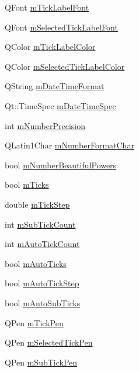 \begin{DoxyCompactItemize}
\item 
Q\+Font \hyperlink{class_q_c_p_axis_add79d1e39c4ed65869a1e9cc79043f3f}{m\+Tick\+Label\+Font}
\item 
Q\+Font \hyperlink{class_q_c_p_axis_a4f2e4919da9615dac612662c249b1119}{m\+Selected\+Tick\+Label\+Font}
\item 
Q\+Color \hyperlink{class_q_c_p_axis_a6384a749b3b56a97df081d8082321ab4}{m\+Tick\+Label\+Color}
\item 
Q\+Color \hyperlink{class_q_c_p_axis_a3bcad40902f45dc4c991a2c3e4d31d70}{m\+Selected\+Tick\+Label\+Color}
\item 
Q\+String \hyperlink{class_q_c_p_axis_a0b7ad83550d71daab4cfee2918e168e0}{m\+Date\+Time\+Format}
\item 
Qt\+::\+Time\+Spec \hyperlink{class_q_c_p_axis_af73bec228c1a3203dc8aef1e84a46759}{m\+Date\+Time\+Spec}
\item 
int \hyperlink{class_q_c_p_axis_acd76e8c783384d99ccc4a13797eec188}{m\+Number\+Precision}
\item 
Q\+Latin1\+Char \hyperlink{class_q_c_p_axis_a39594313deef458f425bba25cd337a8a}{m\+Number\+Format\+Char}
\item 
bool \hyperlink{class_q_c_p_axis_af03809bee3f3e35fcc38d25b6dd5003b}{m\+Number\+Beautiful\+Powers}
\item 
bool \hyperlink{class_q_c_p_axis_ab111e74bba22e06848897c932fc549fe}{m\+Ticks}
\item 
double \hyperlink{class_q_c_p_axis_a4fe96830fc5a2711e20fe5edccfe2ed3}{m\+Tick\+Step}
\item 
int \hyperlink{class_q_c_p_axis_ad70198e6ae2801fc409bc3caec707da9}{m\+Sub\+Tick\+Count}
\item 
int \hyperlink{class_q_c_p_axis_a499fbb67111e4b204738f6c1aa28d842}{m\+Auto\+Tick\+Count}
\item 
bool \hyperlink{class_q_c_p_axis_aac23adcbae246bf165d4539ad65ac9f9}{m\+Auto\+Ticks}
\item 
bool \hyperlink{class_q_c_p_axis_aada8934a5c44978653031782aa37d101}{m\+Auto\+Tick\+Step}
\item 
bool \hyperlink{class_q_c_p_axis_aaae980b0d193d959674e314dbb6c2c3b}{m\+Auto\+Sub\+Ticks}
\item 
Q\+Pen \hyperlink{class_q_c_p_axis_a1d52c78c856d8bd1f331d4ec4e63d944}{m\+Tick\+Pen}
\item 
Q\+Pen \hyperlink{class_q_c_p_axis_a9524593dbc75a5c5b29dbd1cb4b37df5}{m\+Selected\+Tick\+Pen}
\item 
Q\+Pen \hyperlink{class_q_c_p_axis_a32ef56d3a417866720eb12667d27dbd1}{m\+Sub\+Tick\+Pen}

\end{DoxyCompactItemize}
